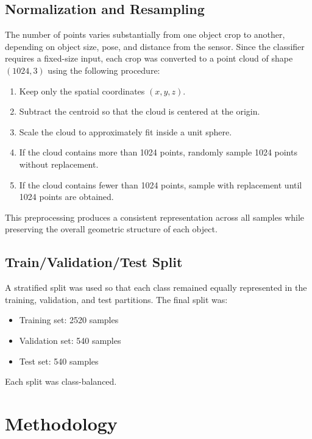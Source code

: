 \documentclass[12pt]{article}
\begin{document}
\subsection{Normalization and Resampling}

The number of points varies substantially from one object crop to another, depending on object size, pose, and distance from the sensor. Since the classifier requires a fixed-size input, each crop was converted to a point cloud of shape $(1024, 3)$ using the following procedure:

\begin{enumerate}
    \item Keep only the spatial coordinates $(x,y,z)$.
    \item Subtract the centroid so that the cloud is centered at the origin.
    \item Scale the cloud to approximately fit inside a unit sphere.
    \item If the cloud contains more than 1024 points, randomly sample 1024 points without replacement.
    \item If the cloud contains fewer than 1024 points, sample with replacement until 1024 points are obtained.
\end{enumerate}

This preprocessing produces a consistent representation across all samples while preserving the overall geometric structure of each object.

\subsection{Train/Validation/Test Split}

A stratified split was used so that each class remained equally represented in the training, validation, and test partitions. The final split was:

\begin{itemize}
    \item Training set: 2520 samples
    \item Validation set: 540 samples
    \item Test set: 540 samples
\end{itemize}

Each split was class-balanced.

\section{Methodology}
\end{document}
